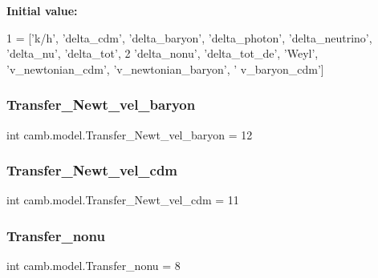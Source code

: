 {\bfseries Initial value\+:}
\begin{DoxyCode}
1 =  [\textcolor{stringliteral}{'k/h'}, \textcolor{stringliteral}{'delta\_cdm'}, \textcolor{stringliteral}{'delta\_baryon'}, \textcolor{stringliteral}{'delta\_photon'}, \textcolor{stringliteral}{'delta\_neutrino'}, \textcolor{stringliteral}{'delta\_nu'}, \textcolor{stringliteral}{'delta\_tot'},
2                   \textcolor{stringliteral}{'delta\_nonu'}, \textcolor{stringliteral}{'delta\_tot\_de'}, \textcolor{stringliteral}{'Weyl'}, \textcolor{stringliteral}{'v\_newtonian\_cdm'}, \textcolor{stringliteral}{'v\_newtonian\_baryon'}, \textcolor{stringliteral}{'
      v\_baryon\_cdm'}]
\end{DoxyCode}
\mbox{\label{namespacecamb_1_1model_ac245ef0f5a6e69c9652405e34469bb81}} 
\subsubsection{\texorpdfstring{Transfer\+\_\+\+Newt\+\_\+vel\+\_\+baryon}{Transfer\_Newt\_vel\_baryon}}
{\footnotesize\ttfamily int camb.\+model.\+Transfer\+\_\+\+Newt\+\_\+vel\+\_\+baryon = 12}

\mbox{\label{namespacecamb_1_1model_a672bcb7c7aade0df5e95a4bfa429bd22}} 
\subsubsection{\texorpdfstring{Transfer\+\_\+\+Newt\+\_\+vel\+\_\+cdm}{Transfer\_Newt\_vel\_cdm}}
{\footnotesize\ttfamily int camb.\+model.\+Transfer\+\_\+\+Newt\+\_\+vel\+\_\+cdm = 11}

\mbox{\label{namespacecamb_1_1model_a42c64d4fcb781aecc70a497619807d42}} 
\subsubsection{\texorpdfstring{Transfer\+\_\+nonu}{Transfer\_nonu}}
{\footnotesize\ttfamily int camb.\+model.\+Transfer\+\_\+nonu = 8}


